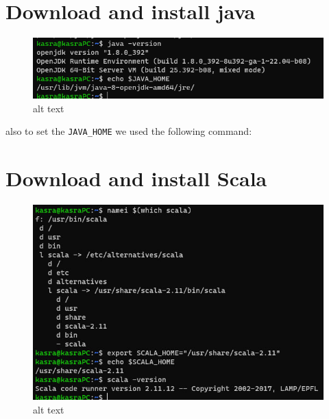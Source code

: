 \documentclass[
]{article}
\author{}
\date{}
\newenvironment{Shaded}{}{}
\newcommand{\BuiltInTok}[1]{#1}
\newcommand{\FunctionTok}[1]{\textcolor[rgb]{0.02,0.16,0.49}{#1}}
\newcommand{\KeywordTok}[1]{\textcolor[rgb]{0.00,0.44,0.13}{\textbf{#1}}}
\newcommand{\NormalTok}[1]{#1}
\newcommand{\StringTok}[1]{\textcolor[rgb]{0.25,0.44,0.63}{#1}}
\newcommand{\VariableTok}[1]{\textcolor[rgb]{0.10,0.09,0.49}{#1}}
\begin{document}
\hypertarget{download-and-install-java}{%
\section{Download and install java}\label{download-and-install-java}}

\begin{figure}
\centering
\includegraphics{image_2024-02-26_21-09-03.png}
\caption{alt text}
\end{figure}

also to set the \texttt{JAVA\_HOME} we used the following command:

\begin{Shaded}
\end{Shaded}

\hypertarget{download-and-install-scala}{%
\section{Download and install Scala}\label{download-and-install-scala}}

\begin{figure}
\centering
\includegraphics{image.png}
\caption{alt text}
\end{figure}
\end{document}
